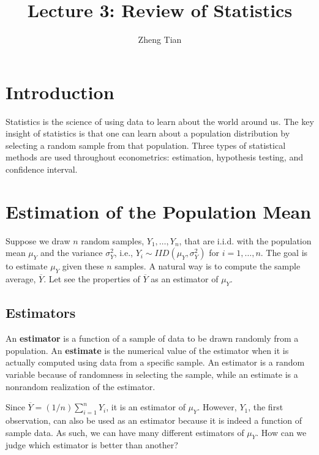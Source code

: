 \documentclass[a4paper,11pt]{article}
\author{Zheng Tian}
\date{}
\title{Lecture 3: Review of Statistics}
\begin{document}
\maketitle
\setcounter{tocdepth}{2}
\tableofcontents


\section{Introduction}
\label{sec:org2005a62}

Statistics is the science of using data to learn about the world
around us. The key insight of statistics is that one can learn about a
population distribution by selecting a random sample from that
population. Three types of statistical methods are used throughout
econometrics: estimation, hypothesis testing, and confidence
interval. 


\section{Estimation of the Population Mean}
\label{sec:org858c808}

Suppose we draw \(n\) random samples, \(Y_1, \ldots, Y_n\), that are
i.i.d. with the population mean \(\mu_Y\) and the variance \(\sigma^2_Y\),
i.e., \(Y_i \sim IID(\mu_Y, \sigma^2_Y)\) for \(i=1, \ldots, n\). The goal
is to estimate \(\mu_Y\) given these \(n\) samples. A natural way is to
compute the sample average, \(\overline{Y}\). Let see the properties of
\(\overline{Y}\) as an estimator of \(\mu_Y\).

\subsection{Estimators}
\label{sec:orgb0894b8}

An \textbf{estimator} is a function of a sample of data to be drawn randomly
from a population. An \textbf{estimate} is the numerical value of the
estimator when it is actually computed using data from a specific
sample. An estimator is a random variable because of randomness in
selecting the sample, while an estimate is a nonrandom realization of
the estimator. 

Since \(\overline{Y} = (1/n)\sum_{i=1}^n Y_i\), it is an estimator of
\(\mu_Y\). However, \(Y_1\), the first observation, can also be used as an
estimator because it is indeed a function of sample data. As such, we
can have many different estimators of \(\mu_Y\). How can we judge which
estimator is better than another?
\end{document}
